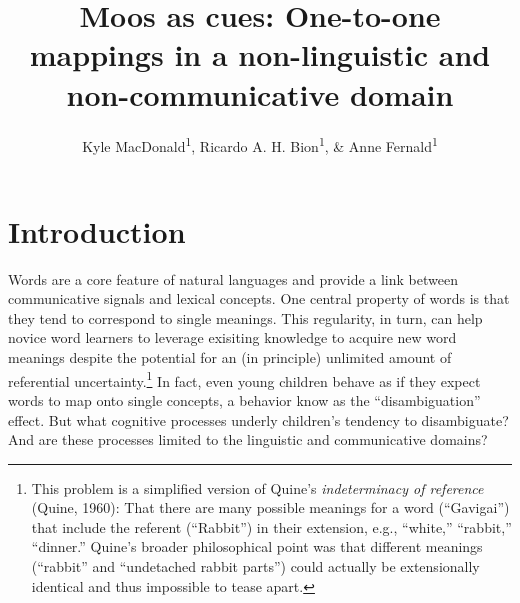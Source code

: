 \documentclass[english,floatsintext,man]{apa6}
\title{Moos as cues: One-to-one mappings in a non-linguistic and
non-communicative domain}
\author{Kyle MacDonald\textsuperscript{1}, Ricardo A. H. Bion\textsuperscript{1}, \& Anne Fernald\textsuperscript{1}}
\affiliation{
    \vspace{0.5cm}
          \textsuperscript{1} Stanford University  }
\theoremstyle{definition}
\theoremstyle{definition}
\theoremstyle{definition}
\theoremstyle{remark}
\begin{document}
\maketitle

\setcounter{secnumdepth}{0}



\hypertarget{introduction}{%
\section{Introduction}\label{introduction}}

Words are a core feature of natural languages and provide a link between
communicative signals and lexical concepts. One central property of
words is that they tend to correspond to single meanings. This
regularity, in turn, can help novice word learners to leverage exisiting
knowledge to acquire new word meanings despite the potential for an (in
principle) unlimited amount of referential uncertainty.\footnote{This
  problem is a simplified version of Quine's
  \textit{indeterminacy of reference} (Quine, 1960): That there are many
  possible meanings for a word (\enquote{Gavigai}) that include the
  referent (\enquote{Rabbit}) in their extension, e.g., \enquote{white,}
  \enquote{rabbit,} \enquote{dinner.} Quine's broader philosophical
  point was that different meanings (\enquote{rabbit} and
  \enquote{undetached rabbit parts}) could actually be extensionally
  identical and thus impossible to tease apart.} In fact, even young
children behave as if they expect words to map onto single concepts, a
behavior know as the \enquote{disambiguation} effect. But what cognitive
processes underly children's tendency to disambiguate? And are these
processes limited to the linguistic and communicative domains?
\end{document}
